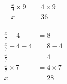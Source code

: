 \documentclass[12pt]{article}
\newcounter{minipagecount}
\begin{document}
\begin{multicols}{2}
\begin{minipage}[t]{0.45\textwidth}
\begin{align*}
        \frac{x}{9} \times9 &= 4 \times9\\
        x &= 36\\
    \end{align*}
\end{minipage} %
\noindent{(\theminipagecount)}\hspace{0.1mm} %
\begin{minipage}[t]{0.45\textwidth} %
    \vspace{-26pt}  %
    \raggedright %
    \begin{align*} %
        \frac{x}{7} + 4 &= 8\\
        \frac{x}{7} + 4 - 4 &= 8 - 4\\
        \frac{x}{7} &= 4\\
        \frac{x}{7} \times7 &= 4 \times7\\
        x &= 28\\
    \end{align*}
\end{minipage}\newpage

\end{multicols}
\end{document}
